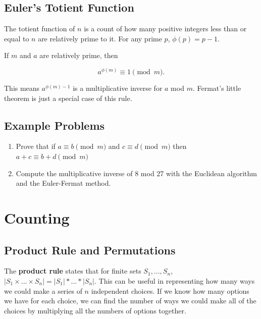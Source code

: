\documentclass[12pt,letterpaper]{article}
\begin{document}
\subsection{Euler's Totient Function}

The totient function of $n$ is a count of how many positive integers less than or equal to $n$ are relatively prime to it. For any prime $p$, $\phi(p) =p-1$. 

If $m$ and $a$ are relatively prime, then

\[
a^{\phi(m)} \equiv 1 \pmod{m}.
\]

This means $a^{\phi(m)-1}$ is a multiplicative inverse for $a$ mod $m$. Fermat's little theorem is just a special case of this rule.

\subsection{Example Problems}
\begin{enumerate}
    \item Prove that if $a \equiv b \pmod{m}$ and $c \equiv d \pmod{m}$ then $a + c \equiv b + d \pmod{m}$ \\
    
    \begin{mdframed}\vspace{3 cm}\end{mdframed}
    
    \item Compute the multiplicative inverse of 8 mod 27 with the Euclidean algorithm and the Euler-Fermat method.
    \begin{mdframed}\vspace{3 cm}\end{mdframed}
     
\end{enumerate}

\section{Counting}

\subsection{Product Rule and Permutations}

The \textbf{product rule} states that for finite sets $S_1,...,S_n$, $|S_1 \times ... \times S_n| = |S_1|*...*|S_n|$. This can be useful in representing how many ways we could make a series of $n$ independent choices. If we know how many options we have for each choice, we can find the number of ways we could make all of the choices by multiplying all the numbers of options together.
\end{document}
